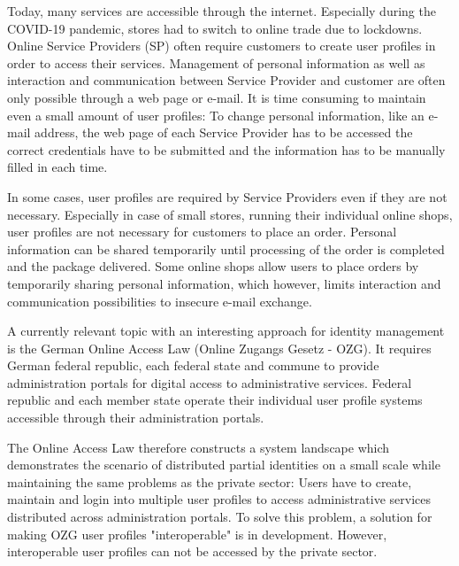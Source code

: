 Today, many services are accessible through the internet. Especially during the COVID-19 pandemic, stores had to switch to online trade due to lockdowns. Online Service Providers (SP) often require customers to create user profiles in order to access their services. Management of personal information as well as interaction and communication between Service Provider and customer are often only possible through a web page or e-mail. It is time consuming to maintain even a small amount of user profiles: To change personal information, like an e-mail address, the web page of each Service Provider has to be accessed the correct credentials have to be submitted and the information has to be manually filled in each time.

In some cases, user profiles are required by Service Providers even if they are not necessary. Especially in case of small stores, running their individual online shops, user profiles are not necessary for customers to place an order. Personal information can be shared temporarily until processing of the order is completed and the package delivered. Some online shops allow users to place orders by temporarily sharing personal information, which however, limits interaction and communication possibilities to insecure e-mail exchange.

A currently relevant topic with an interesting approach for identity management is the German Online Access Law (Online Zugangs Gesetz - OZG). It requires German federal republic, each federal state and commune to provide administration portals for digital access to administrative services. Federal republic and each member state operate their individual user profile systems accessible through their administration portals. 

The Online Access Law therefore constructs a system landscape which demonstrates the scenario of distributed partial identities on a small scale while maintaining the same problems as the private sector: Users have to create, maintain and login into multiple user profiles to access administrative services distributed across administration portals. To solve this problem, a solution for making OZG user profiles "interoperable" is in development. However, interoperable user profiles can not be accessed by the private sector.

